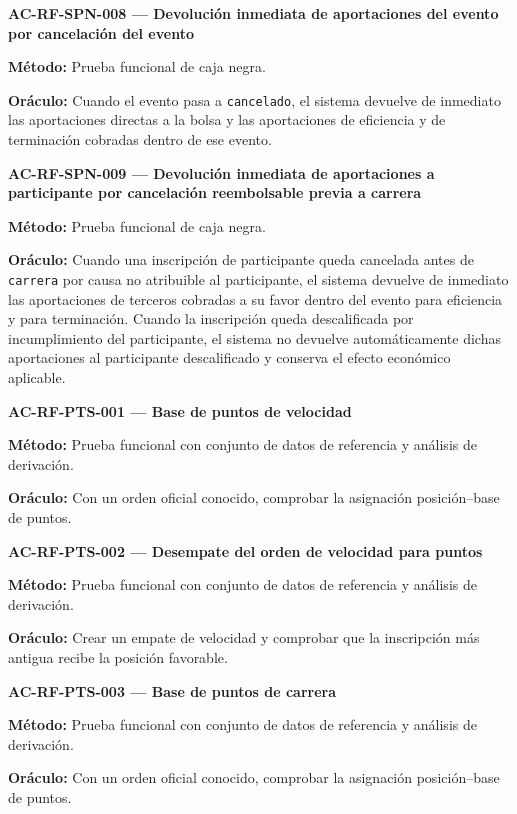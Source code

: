 \documentclass[10pt,letterpaper]{article}
\begin{document}
\noindent\textbf{AC-RF-SPN-008 --- Devolución inmediata de aportaciones del evento por cancelación del evento}\par
\textbf{Método:} Prueba funcional de caja negra.\par
\textbf{Oráculo:} Cuando el evento pasa a \texttt{cancelado}, el sistema devuelve de inmediato las aportaciones directas a la bolsa y las aportaciones de eficiencia y de terminación cobradas dentro de ese evento.\par\vspace{0.45em}
\noindent\textbf{AC-RF-SPN-009 --- Devolución inmediata de aportaciones a participante por cancelación reembolsable previa a carrera}\par
\textbf{Método:} Prueba funcional de caja negra.\par
\textbf{Oráculo:} Cuando una inscripción de participante queda cancelada antes de \texttt{carrera} por causa no atribuible al participante, el sistema devuelve de inmediato las aportaciones de terceros cobradas a su favor dentro del evento para eficiencia y para terminación. Cuando la inscripción queda descalificada por incumplimiento del participante, el sistema no devuelve automáticamente dichas aportaciones al participante descalificado y conserva el efecto económico aplicable.\par\vspace{0.45em}
\noindent\textbf{AC-RF-PTS-001 --- Base de puntos de velocidad}\par
\textbf{Método:} Prueba funcional con conjunto de datos de referencia y análisis de derivación.\par
\textbf{Oráculo:} Con un orden oficial conocido, comprobar la asignación posición--base de puntos.\par\vspace{0.45em}
\noindent\textbf{AC-RF-PTS-002 --- Desempate del orden de velocidad para puntos}\par
\textbf{Método:} Prueba funcional con conjunto de datos de referencia y análisis de derivación.\par
\textbf{Oráculo:} Crear un empate de velocidad y comprobar que la inscripción más antigua recibe la posición favorable.\par\vspace{0.45em}
\noindent\textbf{AC-RF-PTS-003 --- Base de puntos de carrera}\par
\textbf{Método:} Prueba funcional con conjunto de datos de referencia y análisis de derivación.\par
\textbf{Oráculo:} Con un orden oficial conocido, comprobar la asignación posición--base de puntos.\par\vspace{0.45em}
\end{document}
